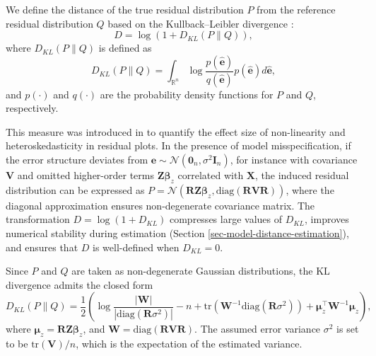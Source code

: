 \documentclass[]{interact}
\theoremstyle{plain}%
\theoremstyle{definition}
\theoremstyle{remark}
\begin{document}
We define the distance of the true residual distribution \(P\) from the
reference residual distribution \(Q\) based on the Kullback--Leibler
divergence \citep{kullback1951information}:
\begin{equation} \label{eq:kl-0}
D = \log\left(1 + D_{KL}(P \| Q)\right),
\end{equation} \noindent where \(D_{KL}(P \| Q)\) is defined as
\begin{equation} \label{eq:kl-1}
D_{KL}(P \| Q) = \int_{\mathbb{R}^{n}}\log\frac{p(\hat{\boldsymbol{e}})}{q(\hat{\boldsymbol{e}})}p(\hat{\boldsymbol{e}})d\hat{\boldsymbol{e}},
\end{equation} \noindent and \(p(\cdot)\) and \(q(\cdot)\) are the
probability density functions for \(P\) and \(Q\), respectively.

This measure was introduced in \citet{li2024plot} to quantify the effect
size of non-linearity and heteroskedasticity in residual plots. In the
presence of model misspecification, if the error structure deviates from
\(\boldsymbol{e} \sim \mathcal{N}(\boldsymbol{0}_n,\sigma^2\boldsymbol{I}_n)\),
for instance with covariance \(\boldsymbol{V}\) and omitted higher-order
terms \(\boldsymbol{Z}\boldsymbol{\beta}_z\) correlated with
\(\boldsymbol{X}\), the induced residual distribution can be expressed
as
\(P = \mathcal{N}(\boldsymbol{R}\boldsymbol{Z}\boldsymbol{\beta}_z, \text{diag}(\boldsymbol{R}\boldsymbol{V}\boldsymbol{R}))\),
where the diagonal approximation ensures non-degenerate covariance
matrix. The transformation \(D = \log(1 + D_{KL})\) compresses large
values of \(D_{KL}\), improves numerical stability during estimation
(Section \ref{sec-model-distance-estimation}), and ensures that \(D\) is
well-defined when \(D_{KL} = 0\).

Since \(P\) and \(Q\) are taken as non-degenerate Gaussian
distributions, the KL divergence admits the closed form
\begin{equation} \label{eq:kl-2}
D_{KL}(P \| Q) = \frac{1}{2}\left(\log\frac{|\boldsymbol{W}|}{|\text{diag}(\boldsymbol{R}\sigma^2)|} - n + \text{tr}(\boldsymbol{W}^{-1}\text{diag}(\boldsymbol{R}\sigma^2)) + \boldsymbol{\mu}_z^\top\boldsymbol{W}^{-1}\boldsymbol{\mu}_z\right),
\end{equation} \noindent where
\(\boldsymbol{\mu}_z = \boldsymbol{R}\boldsymbol{Z}\boldsymbol{\beta}_z\),
and
\(\boldsymbol{W} = \text{diag}(\boldsymbol{R}\boldsymbol{V}\boldsymbol{R})\).
The assumed error variance \(\sigma^2\) is set to be
\(\text{tr}(\boldsymbol{V})/n\), which is the expectation of the
estimated variance.
\end{document}
